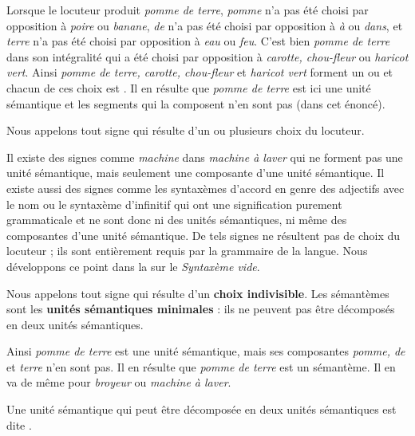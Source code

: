 Lorsque le locuteur produit \textit{pomme de terre}, \textit{pomme} n’a pas été choisi par opposition à \textit{poire} ou \textit{banane}, \textit{de} n’a pas été choisi par opposition à \textit{à} ou \textit{dans}, et \textit{terre} n’a pas été choisi par opposition à \textit{eau} ou \textit{feu}. C’est bien \textit{pomme de terre} dans son intégralité qui a été choisi par opposition à \textit{carotte, chou-fleur} ou \textit{haricot vert}. Ainsi \textit{pomme de terre, carotte, chou-fleur} et \textit{haricot vert} forment un  ou  et chacun de ces choix est . Il en résulte que \textit{pomme de terre} est ici une unité sémantique et les segments qui la composent n’en sont pas (dans cet énoncé).

\begin{styleLivreImportant}
Nous appelons  tout signe qui résulte d’un ou plusieurs choix du locuteur.
\end{styleLivreImportant}

Il existe des signes comme \textit{machine} dans \textit{machine à laver} qui ne forment pas une unité sémantique, mais seulement une composante d’une unité sémantique. Il existe aussi des signes comme les syntaxèmes d’accord en genre des adjectifs avec le nom ou le syntaxème d’infinitif qui ont une signification purement grammaticale et ne sont donc ni des unités sémantiques, ni même des composantes d’une unité sémantique. De tels signes ne résultent pas de choix du locuteur ; ils sont entièrement requis par la grammaire de la langue. Nous développons ce point dans la  sur le \textit{Syntaxème vide}.

\begin{styleLivreImportant}
Nous appelons  tout signe qui résulte d’un \textbf{choix indivisible}. Les sémantèmes sont les \textbf{unités sémantiques minimales} : ils ne peuvent pas être décomposés en deux unités sémantiques.
\end{styleLivreImportant}

Ainsi \textit{pomme de terre} est une unité sémantique, mais ses composantes \textit{pomme, de} et \textit{terre} n’en sont pas. Il en résulte que \textit{pomme de terre} est un sémantème. Il en va de même pour \textit{broyeur} ou \textit{machine à laver}.

\begin{styleLivreImportant}
Une unité sémantique qui peut être décomposée en deux unités sémantiques est dite .
\end{styleLivreImportant}

